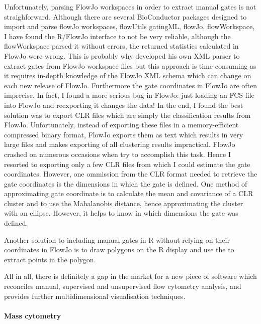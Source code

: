 Unfortunately, parsing FlowJo workspaces in order to extract manual gates is not straighforward.
Although there are several BioConductor packages designed to import and parse flowJo workspaces, flowUtils gatingML, flowJo, flowWorkspace, I have found the R/FlowJo interface to not be very reliable, although the flowWorkspace parsed it without errors, the returned statistics calculated in FlowJo were wrong.
This is probably why  developed his own XML parser to extract gates from FlowJo workspace files but this approach is time-consuming as it requires in-depth knowledge of the FlowJo XML schema which can change on each new release of FlowJo.
Furthermore the gate coordinates in FlowJo are often imprecise.
In fact, I found a more serious bug in FlowJo: just loading an FCS file into FlowJo and reexporting it changes the data!
In the end, I found the best solution was to export CLR files which are simply the classification results from FlowJo.
Unfortunately, instead of exporting these files in a memory-efficient compressed binary format, FlowJo exports them as text which results in very large files and makes exporting of all clustering results impractical.  FlowJo crashed on numerous occasions when try to accomplish this task.
Hence I resorted to exporting only a few CLR files from which I could estimate the gate coordinates.
However, one ommission from the CLR format needed to retrieve the gate coordinates is the dimensions in which the gate is defined.
One method of approximating gate coordinate is to calculate the mean and covariance of a CLR cluster and to use the Mahalanobis distance, hence approximating the cluster with an ellipse.
However, it helps to know in which dimensions the gate was defined.

Another solution to including manual gates in R without relying on their coordinates in FlowJo is to draw polygons on the R display and use the  to extract points in the polygon.

All in all, there is definitely a gap in the market for a new piece of software which reconciles manual, supervised and unsupervised flow cytometry analysis, and provides further multidimensional visualisation techniques.


\paragraph{Mass cytometry}

